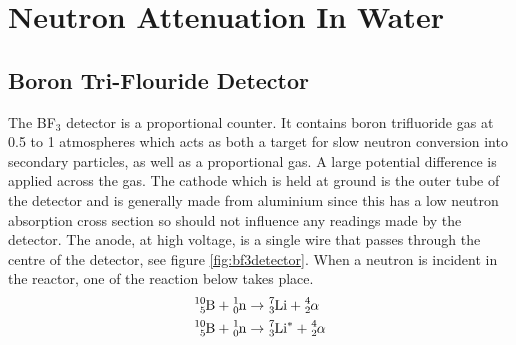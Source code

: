 \section{Neutron Attenuation In Water} %
\label{sec:neutron_attenuation_in_water}

\subsection{Boron Tri-Flouride Detector} %
\label{ssub:boron_tri_flouride_detector}
The BF$_3$ detector is a proportional counter. It contains boron trifluoride gas at 0.5 to 1 atmospheres which acts as both a target for slow neutron conversion into secondary particles, as well as a proportional gas. A large potential difference is applied across the gas. The cathode which is held at ground is the outer tube of the detector and is generally made from aluminium since this has a low neutron absorption cross section so should not influence any readings made by the detector. The anode, at high voltage, is a single wire that passes through the centre of the detector, see figure \ref{fig:bf3detector}. When a neutron is incident in the reactor, one of the reaction below takes place.
\begin{align}
	\cf{^{10}_{5}B} + \cf{^{1}_{0}n} &\rightarrow \cf{^{7}_{3}Li} + \cf{^{4}_{2}\alpha} \label{eq:bf31}\\
	\cf{^{10}_{5}B} + \cf{^{1}_{0}n} &\rightarrow \cf{^{7}_{3}Li^*} + \cf{^{4}_{2}\alpha} \label{eq:bf32}
\end{align} 

